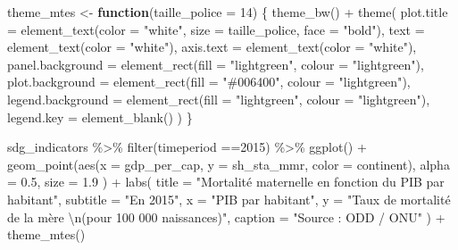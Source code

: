 \documentclass[
]{book}
\newenvironment{Shaded}{\begin{snugshade}}{\end{snugshade}}
\newcommand{\AttributeTok}[1]{\textcolor[rgb]{0.77,0.63,0.00}{#1}}
\newcommand{\ControlFlowTok}[1]{\textcolor[rgb]{0.13,0.29,0.53}{\textbf{#1}}}
\newcommand{\DecValTok}[1]{\textcolor[rgb]{0.00,0.00,0.81}{#1}}
\newcommand{\FloatTok}[1]{\textcolor[rgb]{0.00,0.00,0.81}{#1}}
\newcommand{\FunctionTok}[1]{\textcolor[rgb]{0.00,0.00,0.00}{#1}}
\newcommand{\NormalTok}[1]{#1}
\newcommand{\OtherTok}[1]{\textcolor[rgb]{0.56,0.35,0.01}{#1}}
\newcommand{\SpecialCharTok}[1]{\textcolor[rgb]{0.00,0.00,0.00}{#1}}
\newcommand{\StringTok}[1]{\textcolor[rgb]{0.31,0.60,0.02}{#1}}
\begin{document}
\begin{Shaded}
\begin{Highlighting}[]
\NormalTok{theme\_mtes }\OtherTok{\textless{}{-}} \ControlFlowTok{function}\NormalTok{(}\AttributeTok{taille\_police =} \DecValTok{14}\NormalTok{) \{}
  \FunctionTok{theme\_bw}\NormalTok{() }\SpecialCharTok{+}
    \FunctionTok{theme}\NormalTok{(}
      \AttributeTok{plot.title =} \FunctionTok{element\_text}\NormalTok{(}\AttributeTok{color =} \StringTok{"white"}\NormalTok{, }\AttributeTok{size =}\NormalTok{ taille\_police, }\AttributeTok{face =} \StringTok{"bold"}\NormalTok{),}
      \AttributeTok{text =} \FunctionTok{element\_text}\NormalTok{(}\AttributeTok{color =} \StringTok{"white"}\NormalTok{),}
      \AttributeTok{axis.text =} \FunctionTok{element\_text}\NormalTok{(}\AttributeTok{color =} \StringTok{"white"}\NormalTok{),}
      \AttributeTok{panel.background =} \FunctionTok{element\_rect}\NormalTok{(}\AttributeTok{fill =} \StringTok{"lightgreen"}\NormalTok{, }\AttributeTok{colour =} \StringTok{"lightgreen"}\NormalTok{),}
      \AttributeTok{plot.background =} \FunctionTok{element\_rect}\NormalTok{(}\AttributeTok{fill =} \StringTok{"\#006400"}\NormalTok{, }\AttributeTok{colour =} \StringTok{"lightgreen"}\NormalTok{),}
      \AttributeTok{legend.background =} \FunctionTok{element\_rect}\NormalTok{(}\AttributeTok{fill =} \StringTok{"lightgreen"}\NormalTok{, }\AttributeTok{colour =} \StringTok{"lightgreen"}\NormalTok{),}
      \AttributeTok{legend.key =} \FunctionTok{element\_blank}\NormalTok{()}
\NormalTok{    )}
\NormalTok{\}}

\NormalTok{sdg\_indicators }\SpecialCharTok{\%\textgreater{}\%} 
  \FunctionTok{filter}\NormalTok{(timeperiod }\SpecialCharTok{==}\DecValTok{2015}\NormalTok{) }\SpecialCharTok{\%\textgreater{}\%} 
  \FunctionTok{ggplot}\NormalTok{() }\SpecialCharTok{+}
  \FunctionTok{geom\_point}\NormalTok{(}\FunctionTok{aes}\NormalTok{(}\AttributeTok{x =}\NormalTok{ gdp\_per\_cap, }
                 \AttributeTok{y =}\NormalTok{ sh\_sta\_mmr,}
                 \AttributeTok{color =}\NormalTok{ continent),}
    \AttributeTok{alpha =} \FloatTok{0.5}\NormalTok{, }
    \AttributeTok{size =} \FloatTok{1.9}
\NormalTok{  ) }\SpecialCharTok{+}
  \FunctionTok{labs}\NormalTok{(}
    \AttributeTok{title =} \StringTok{"Mortalité maternelle en fonction du PIB par habitant"}\NormalTok{,}
    \AttributeTok{subtitle =} \StringTok{"En 2015"}\NormalTok{,}
    \AttributeTok{x =} \StringTok{"PIB par habitant"}\NormalTok{,}
    \AttributeTok{y =} \StringTok{"Taux de mortalité de la mère }\SpecialCharTok{\textbackslash{}n}\StringTok{(pour 100 000 naissances)"}\NormalTok{,}
    \AttributeTok{caption =} \StringTok{"Source : ODD / ONU"}
\NormalTok{  ) }\SpecialCharTok{+}
  \FunctionTok{theme\_mtes}\NormalTok{()}
\end{Highlighting}
\end{Shaded}
\end{document}
